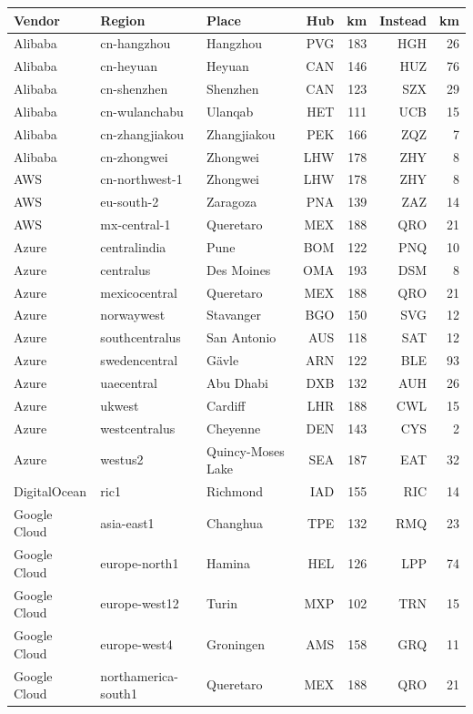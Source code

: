 \begin{tabular}{lllrrrr}
\toprule
Vendor & Region & Place & Hub & km & Instead & km \\
\midrule
Alibaba & cn-hangzhou & Hangzhou & PVG & 183 & HGH & 26 \\
Alibaba & cn-heyuan & Heyuan & CAN & 146 & HUZ & 76 \\
Alibaba & cn-shenzhen & Shenzhen & CAN & 123 & SZX & 29 \\
Alibaba & cn-wulanchabu & Ulanqab & HET & 111 & UCB & 15 \\
Alibaba & cn-zhangjiakou & Zhangjiakou & PEK & 166 & ZQZ & 7 \\
Alibaba & cn-zhongwei & Zhongwei & LHW & 178 & ZHY & 8 \\
AWS & cn-northwest-1 & Zhongwei & LHW & 178 & ZHY & 8 \\
AWS & eu-south-2 & Zaragoza & PNA & 139 & ZAZ & 14 \\
AWS & mx-central-1 & Queretaro & MEX & 188 & QRO & 21 \\
Azure & centralindia & Pune & BOM & 122 & PNQ & 10 \\
Azure & centralus & Des Moines & OMA & 193 & DSM & 8 \\
Azure & mexicocentral & Queretaro & MEX & 188 & QRO & 21 \\
Azure & norwaywest & Stavanger & BGO & 150 & SVG & 12 \\
Azure & southcentralus & San Antonio & AUS & 118 & SAT & 12 \\
Azure & swedencentral & Gävle & ARN & 122 & BLE & 93 \\
Azure & uaecentral & Abu Dhabi & DXB & 132 & AUH & 26 \\
Azure & ukwest & Cardiff & LHR & 188 & CWL & 15 \\
Azure & westcentralus & Cheyenne & DEN & 143 & CYS & 2 \\
Azure & westus2 & Quincy-Moses Lake & SEA & 187 & EAT & 32 \\
DigitalOcean & ric1 & Richmond & IAD & 155 & RIC & 14 \\
Google Cloud & asia-east1 & Changhua & TPE & 132 & RMQ & 23 \\
Google Cloud & europe-north1 & Hamina & HEL & 126 & LPP & 74 \\
Google Cloud & europe-west12 & Turin & MXP & 102 & TRN & 15 \\
Google Cloud & europe-west4 & Groningen & AMS & 158 & GRQ & 11 \\
Google Cloud & northamerica-south1 & Queretaro & MEX & 188 & QRO & 21 \\

\end{tabular}

